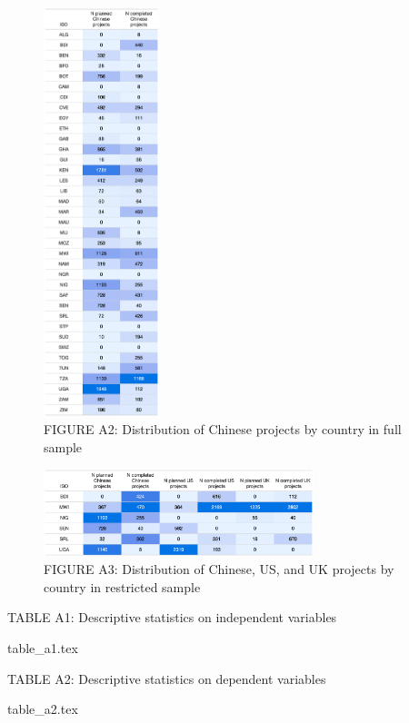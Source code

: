 \documentclass[9pt]{article}
\begin{document}
\begin{figure}[H]
\centering
\includegraphics[width=0.3\textwidth]{figures/figure_a2.png}
\caption{FIGURE A2: Distribution of Chinese projects by country in full sample}
\end{figure}

\begin{figure}[H]
\centering
\includegraphics[width=0.7\textwidth]{figures/figure_a3.png}
\caption{FIGURE A3: Distribution of Chinese, US, and UK projects by country in restricted sample}
\end{figure}

\setlength{\tabcolsep}{5pt}
\begin{table}[H]
\caption{TABLE A1: Descriptive statistics on independent variables}
\label{reg}
\centering
{table_a1.tex}
\end{table}

\setlength{\tabcolsep}{5pt}
\begin{table}[H]
\caption{TABLE A2: Descriptive statistics on dependent variables}
\label{reg}
\centering
{table_a2.tex}
\end{table}
\end{document}
